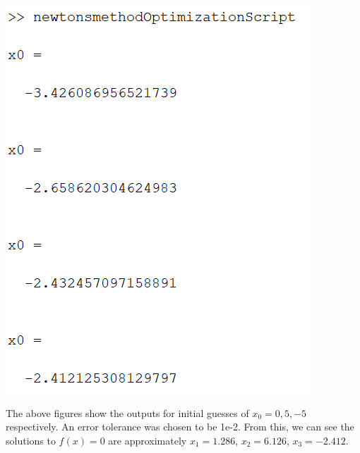 \documentclass{article}
\begin{document}
\begin{center}
        \includegraphics[scale = 0.6]{prob_2_7_1_3}
        \newline
    \end{center}
    The above figures show the outputs for initial guesses of $x_0 = 0,5,-5$ respectively. An error tolerance was chosen to be 1e-2. From this, we can see the solutions to $f(x) = 0$ are approximately $x_1 = 1.286$, $x_2 = 6.126$, $x_3 = -2.412$.
    \newline\newline
\end{document}
